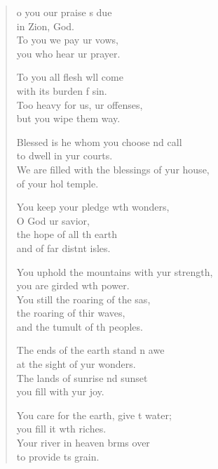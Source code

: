 \begin{verse}
  \begin{patverse}
    o you our praise \pointup{\i}s due\Med\\
in Zion,  God.\\
To you we pay ur vows,\Med\\
you who hear ur prayer.

To you all flesh w\pointup{\i}ll come\Med\\
with its burden f sin.\\
Too heavy for us, ur offenses,\Med\\
but you wipe them way.

Blessed is he whom you choose nd call\Med\\
to dwell in yur courts.\\
We are filled with the blessings of yur house,\Med\\
of your hol temple.

You keep your pledge w\pointup{\i}th wonders,\Med\\
O God ur savior,\\
the hope of all th earth\Med\\
and of far distnt isles.

You uphold the mountains with yur strength,\Med\\
you are girded w\pointup{\i}th power.\\
You still the roaring of the sas,\Flex\\
the roaring of thir waves,\Med\\
and the tumult of th peoples.

The ends of the earth stand \pointup{\i}n awe\Med\\
at the sight of yur wonders.\\
The lands of sunrise nd sunset\Med\\
you fill with yur joy.

You care for the earth, give \pointup{\i}t water;\Med\\
you fill it w\pointup{\i}th riches.\\
Your river in heaven br\pointup{\i}ms over\Med\\
to provide \pointup{\i}ts grain.


\end{patverse}
\end{verse}
